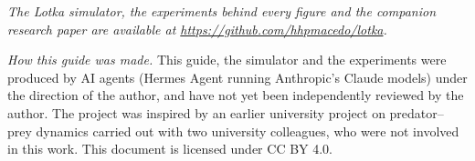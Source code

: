 \documentclass[11pt,a4paper]{article}
\begin{document}
\vfill
{\small\textit{The Lotka simulator, the experiments behind every figure and the companion research paper are
available at \url{https://github.com/hhpmacedo/lotka}.}}

\medskip
{\small\textit{How this guide was made.} This guide, the simulator and the experiments were produced by AI agents
(Hermes Agent running Anthropic's Claude models) under the direction of the author, and have not yet been
independently reviewed by the author. The project was inspired by an earlier university project on
predator--prey dynamics carried out with two university colleagues, who were not involved in this work. This document is licensed under CC BY 4.0.}
\end{document}
